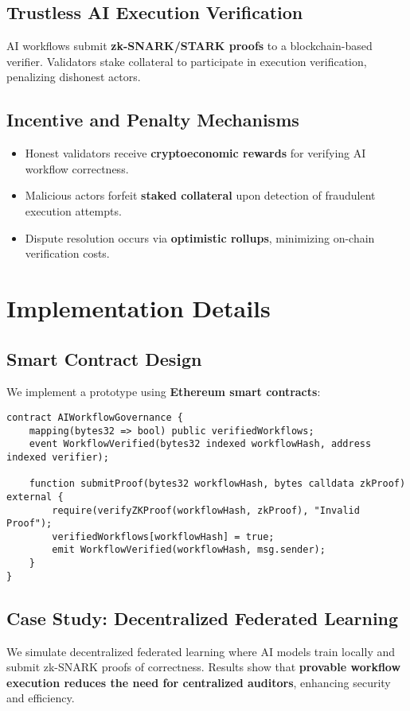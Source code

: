 \documentclass{article}
\begin{document}
\subsection{Trustless AI Execution Verification}
AI workflows submit \textbf{zk-SNARK/STARK proofs} to a blockchain-based verifier. Validators stake collateral to participate in execution verification, penalizing dishonest actors.

\subsection{Incentive and Penalty Mechanisms}
\begin{itemize}
    \item Honest validators receive \textbf{cryptoeconomic rewards} for verifying AI workflow correctness.
    \item Malicious actors forfeit \textbf{staked collateral} upon detection of fraudulent execution attempts.
    \item Dispute resolution occurs via \textbf{optimistic rollups}, minimizing on-chain verification costs.
\end{itemize}

\section{Implementation Details}
\subsection{Smart Contract Design}
We implement a prototype using \textbf{Ethereum smart contracts}:
\begin{verbatim}
contract AIWorkflowGovernance {
    mapping(bytes32 => bool) public verifiedWorkflows;
    event WorkflowVerified(bytes32 indexed workflowHash, address indexed verifier);

    function submitProof(bytes32 workflowHash, bytes calldata zkProof) external {
        require(verifyZKProof(workflowHash, zkProof), "Invalid Proof");
        verifiedWorkflows[workflowHash] = true;
        emit WorkflowVerified(workflowHash, msg.sender);
    }
}
\end{verbatim}

\subsection{Case Study: Decentralized Federated Learning}
We simulate decentralized federated learning where AI models train locally and submit zk-SNARK proofs of correctness. Results show that \textbf{provable workflow execution reduces the need for centralized auditors}, enhancing security and efficiency.
\end{document}
